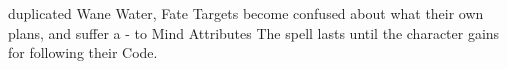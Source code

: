   {duplicated}%
  {Wane}%
  {Water, Fate}%
  {}%
  {Targets become confused about what their own plans, and suffer a - to Mind Attributes}%
  {The spell lasts until the character gains  for following their Code.}

